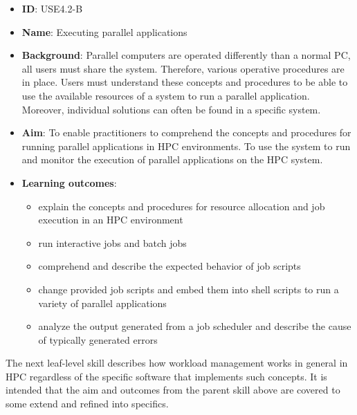 \documentclass[jocse]{jocseart}
\begin{document}
\begin{itemize}
  \item \textbf{ID}: USE4.2-B
  \item \textbf{Name}: Executing parallel applications
  \item \textbf{Background}:
  Parallel computers are operated differently than a normal PC, all users must share the system. Therefore, various operative procedures are in place. Users must understand these concepts and procedures to be able to use the available resources of a system to run a parallel application. Moreover, individual solutions can often be found in a specific system.
  \item \textbf{Aim}: To enable practitioners to comprehend the concepts and procedures for running parallel applications in HPC environments.
  To use the system to run and monitor the execution of parallel applications on the HPC system.

  \item \textbf{Learning outcomes}:
    \begin{itemize}
    \item explain the concepts and procedures for resource allocation and job execution in an HPC environment
    \item run interactive jobs and batch jobs
    \item comprehend and describe the expected behavior of job scripts
    \item change provided job scripts and embed them into shell scripts to run a variety of parallel applications
    \item analyze the output generated from a job scheduler and describe the cause of typically generated errors
    \end{itemize}
\end{itemize}

The next leaf-level skill describes how workload management works in general in HPC regardless of the specific software that implements such concepts.
It is intended that the aim and outcomes from the parent skill above are covered to some extend and refined into specifics.
\end{document}
